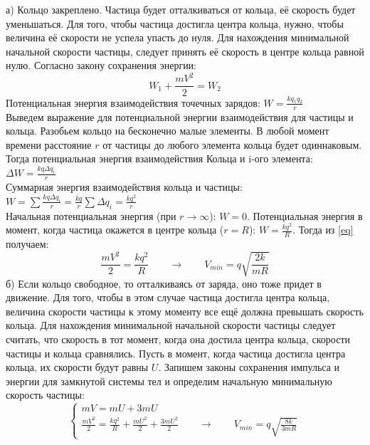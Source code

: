 \begin{sol}
а) Кольцо закреплено. Частица будет отталкиваться от кольца, её скорость будет уменьшаться. Для того, чтобы частица достигла центра кольца, нужно, чтобы величина её скорости не успела упасть до нуля. Для нахождения минимальной начальной скорости частицы, следует принять её скорость в центре кольца равной нулю. Согласно закону сохранения энергии:
\begin{equation}\label{eq}
W_1 + \frac{m V^2}{2} = W_2
\end{equation}
Потенциальная энергия взаимодействия точечных зарядов: $W = \frac{k q_1 q_2}{r}$ \\
Выведем выражение для потенциальной энергии взаимодействия для частицы и кольца. Разобьем кольцо на бесконечно малые элементы. В любой момент времени расстояние $r$ от частицы до любого элемента кольца будет одиннаковым. Тогда потенциальная энергия взаимодействия Кольца и i-ого элемента: $\Delta W = \frac{k q \Delta q_i}{r}$ \\
Суммарная энергия взаимодействия кольца и частицы: $W = \sum \frac{k q \Delta q_i}{r} = \frac{k q}{r} \sum \Delta q_i = \frac{k q^2}{r}$ \\
Начальная потенциальная энергия (при $r \rightarrow \infty$): $W = 0$. Потенциальная энергия в момент, когда частица окажется в центре кольца ($r = R$): $W = \frac{k q^2}{R}$. Тогда из \ref{eq} получаем:
\begin{equation*}
\frac{m V^2}{2} = \frac{k q^2}{R} \qquad \rightarrow \qquad V_{min} = q \sqrt{\frac{2 k}{m R}}
\end{equation*}
б) Если кольцо свободное, то отталкиваясь от заряда, оно тоже придет в движение. Для того, чтобы в этом случае частица достигла центра кольца, величина скорости частицы к этому моменту все ещё должна превышать скорость кольца. Для нахождения минимальной начальной скорости частицы следует считать, что скорость в тот момент, когда она достила центра кольца, скорости частицы и кольца сравнялись. Пусть в момент, когда частица достигла центра кольца, их скорости будут равны $U$. Запишем законы сохранения импульса и энергии для замкнутой системы тел и определим начальную минимальную скорость частицы:
\begin{equation*}
\begin{cases}
mV = m U + 3 m U \\
\frac{m V^2}{2} = \frac{k q^2}{R} + \frac{m U^2}{2} + \frac{3 m U^2}{2} \qquad \rightarrow \qquad V_{min} = q \sqrt{\frac{8 k}{3 m R}}
\end{cases}
\end{equation*} 
\end{sol}